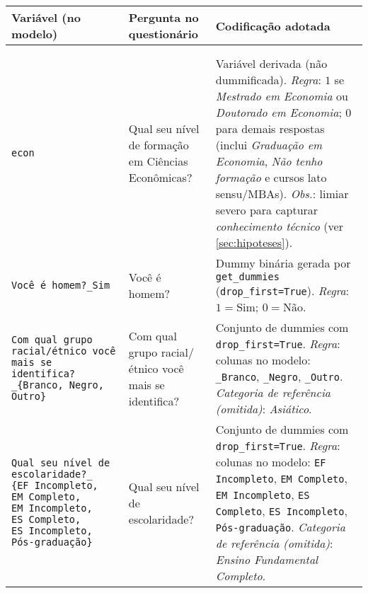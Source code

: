 \begin{apendicesenv}
\begin{longtable}{@{}%
  >{\raggedright\arraybackslash}p{4cm}%
  >{\raggedright\arraybackslash}p{4cm}%
  >{\raggedright\arraybackslash}p{7cm}@{}}
\toprule
\textbf{Variável (no modelo)} & \textbf{Pergunta no questionário} & \textbf{Codificação adotada} \\
\midrule
\endhead

\midrule
\multicolumn{3}{r}{\small Continuação na próxima página} \\
\endfoot

\bottomrule
\multicolumn{3}{@{}l}{\footnotesize \textit{Fonte: Elaboração própria.}}\\
\endlastfoot

    \texttt{econ} & Qual seu nível de formação em Ciências Econômicas? & 
    Variável derivada (não dummificada). \newline
    \emph{Regra}: $1$ se \textit{Mestrado em Economia} ou \textit{Doutorado em Economia}; $0$ para demais respostas (inclui \textit{Graduação em Economia}, \textit{Não tenho formação} e cursos lato sensu/MBAs). \newline
    \emph{Obs.}: limiar severo para capturar \emph{conhecimento técnico} (ver \autoref{sec:hipoteses}). \\ \hline

    \texttt{Você é homem?{\_}Sim} & Você é homem? &
    Dummy binária gerada por \texttt{get\_dummies} (\texttt{drop\_first=True}). \newline
    \emph{Regra}: $1=\text{Sim}$; $0=\text{Não}$. \\ \hline

    \texttt{Com qual grupo racial/étnico você mais se identifica?{\_}\{Branco, Negro, Outro\}} &
    Com qual grupo racial/étnico você mais se identifica? &
    Conjunto de dummies com \texttt{drop\_first=True}. \newline
    \emph{Regra}: colunas no modelo: \texttt{\_Branco}, \texttt{\_Negro}, \texttt{\_Outro}. \newline
    \emph{Categoria de referência (omitida)}: \textit{Asiático}. \\ \hline

    \texttt{Qual seu nível de escolaridade?{\_}
    \{EF~Incompleto, EM~Completo, EM~Incompleto, ES~Completo, ES~Incompleto, Pós-graduação\}} &
    Qual seu nível de escolaridade? &
    Conjunto de dummies com \texttt{drop\_first=True}. \newline
    \emph{Regra}: colunas no modelo: \texttt{EF Incompleto}, \texttt{EM Completo}, \texttt{EM Incompleto}, \texttt{ES Completo}, \texttt{ES Incompleto}, \texttt{Pós-graduação}. \newline
    \emph{Categoria de referência (omitida)}: \textit{Ensino Fundamental Completo}. \\ \hline


\end{longtable}
\end{apendicesenv}
